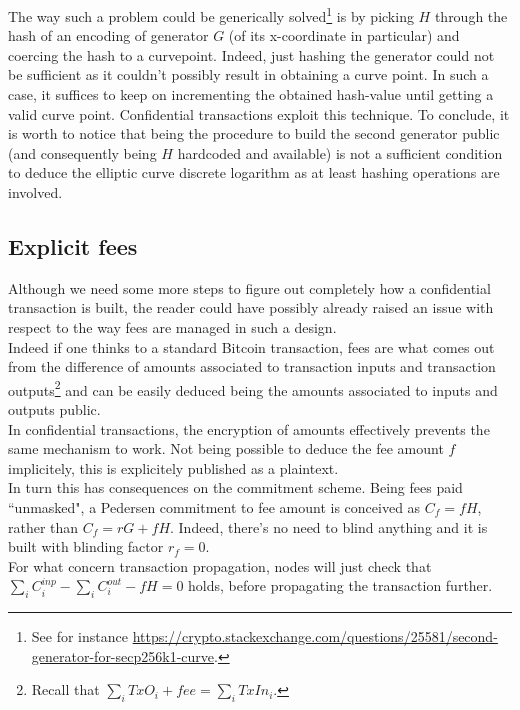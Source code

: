The way such a problem could be generically solved\footnote{See for instance \url{https://crypto.stackexchange.com/questions/25581/second-generator-for-secp256k1-curve}.} is by picking $H$ through the hash of an encoding of generator $G$ (of its x-coordinate in particular) and coercing the hash to a curvepoint. Indeed, just hashing the generator could not be sufficient as it couldn't possibly result in obtaining a curve point. In such a case, it suffices to keep on incrementing the obtained hash-value until getting a valid curve point. Confidential transactions exploit this technique. To conclude, it is worth to notice that being the procedure to build the second generator public (and consequently being $H$ hardcoded and available) is not a sufficient condition to deduce the elliptic curve discrete logarithm as at least hashing operations are involved.

\subsection{Explicit fees}
\label{sec::explicit_fees}
Although we need some more steps to figure out completely how a confidential transaction is built, the reader could have possibly already raised an issue with respect to the way fees are managed in such a design.\\
Indeed if one thinks to a standard Bitcoin transaction, fees are what comes out from the difference of amounts associated to transaction inputs and transaction outputs\footnote{Recall that $\sum_i TxO_i + fee = \sum_i TxIn_i$.} and can be easily deduced being the amounts associated to inputs and outputs public.\\
In confidential transactions, the encryption of amounts effectively prevents the same mechanism to work. Not being possible to deduce the fee amount $f$ implicitely, this is explicitely published as a plaintext.\\
In turn this has consequences on the commitment scheme. Being fees paid ``unmasked", a Pedersen commitment to fee amount is conceived as $C_f = fH$, rather than $C_f = rG + fH$. Indeed, there's no need to blind anything and it is built with blinding factor $r_f=0$.\\
For what concern transaction propagation, nodes will just check that $\sum_i C_i^{inp} - \sum_i C_i^{out} - fH = 0$ holds, before propagating the transaction further.

